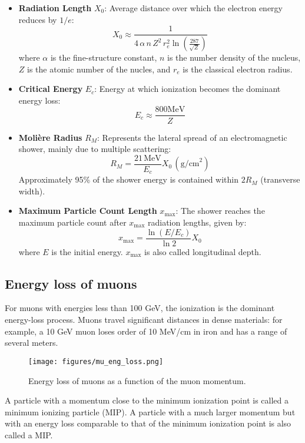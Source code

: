 \documentclass[a4paper,12pt]{article}
\begin{document}
\begin{itemize}
    \item \textbf{Radiation Length} \( X_0 \): Average distance over which the electron energy reduces by \( 1/e \):
    \[
    X_0 \approx \frac{1}{4 \, \alpha \, n \, Z^2 \, r_e^2 \ln \left( \frac{287}{\sqrt{Z}} \right)}
    \]
    where \( \alpha \) is the fine-structure constant, \( n \) is the number density of the nucleus, \( Z \) is the atomic number of the nucles, and \( r_e \) is the classical electron radius.

    \item \textbf{Critical Energy} \( E_c\): Energy at which ionization becomes the dominant energy loss:
    \[
    E_c \approx \frac{800\text{MeV}}{Z}
    \]

    \item \textbf{Molière Radius} \( R_M \): Represents the lateral spread of an electromagnetic shower, mainly due to multiple scattering:
    \[
    R_M = \frac{21 \, \text{MeV}}{E_c}  X_0 \, (\text{g/cm}^2)
    \]
    Approximately 95\% of the shower energy is contained within \( 2 R_M \) (transverse width).

    \item \textbf{Maximum Particle Count Length} \( x_{\text{max}} \): The shower reaches the maximum particle count after \( x_{\text{max}} \) radiation lengths, given by:
    \[
    x_{\text{max}} = \frac{\ln(E / E_c)}{\ln 2} X_0
    \]
    where \( E \) is the initial energy. \( x_{\text{max}} \) is also called longitudinal depth.
\end{itemize}

\subsection{Energy loss of muons}

For muons with energies less than 100 GeV, the ionization is the dominant energy-loss process.
Muons travel significant distances in dense materials: for example, a 10 GeV muon loses order of 10 MeV/cm in iron and has a range of several meters.

\begin{figure}[h]
    \centering
    \texttt{[image: figures/mu\_eng\_loss.png]}
    \caption{Energy loss of muons as a function of the muon momentum.}
\end{figure}

A particle with a momentum close to the minimum ionization point is called a minimum ionizing particle (MIP).
A particle with a much larger momentum but with an energy loss comparable to that of the minimum ionization point is also called a MIP.
\end{document}
